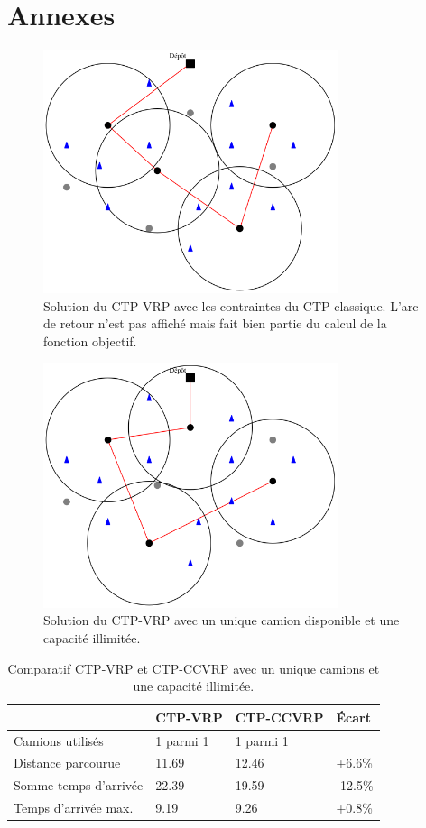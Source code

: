 \documentclass[5p,authoryear,square]{elsarticle}
\begin{document}
\section*{Annexes}
\begin{figure}[p] \centering
	\includegraphics[width=3.4in]{figures/ctp_un_camion}
	\caption[]{Solution du CTP-VRP avec les contraintes du CTP classique. L'arc de retour n'est pas affiché mais fait bien partie du calcul de la fonction objectif.} \label{ctp_un_camion} 
\end{figure}

\begin{figure}[p]\centering
	\centerline{\includegraphics[width=3.4in]{figures/ctpccvrp_un_camion}}
	\caption[]{Solution du CTP-VRP avec un unique camion disponible et une capacité illimitée.} \label{ctpccvrp_un_camion}
\end{figure}

\begin{table}[p] \centering \begin{tabular}{@{\small}llll@{}} \toprule %
 & {\footnotesize CTP-VRP} &  {\footnotesize CTP-CCVRP} & Écart \\ \midrule
Camions utilisés & 1 parmi 1 & 1 parmi 1 &  \\
Distance parcourue & 11.69 & 12.46 & +6.6\% \\
Somme temps d'arrivée & 22.39 & 19.59 & -12.5\% \\
Temps d'arrivée max. & 9.19 & 9.26 & +0.8\% \\ \bottomrule
\end{tabular} \caption{Comparatif CTP-VRP et CTP-CCVRP avec un unique camions et une capacité illimitée.} \label{table_un_camion}
\end{table}
\end{document}

